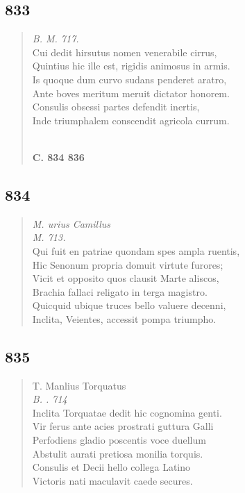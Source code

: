 \documentclass[11pt, a4paper]{report}
\begin{document}
            \subsection*{833}
      \begin{verse}
      \textit{B. M. 717.} \\ Cui dedit hirsutus nomen venerabile cirrus, \\ Quintius hic ille est, rigidis animosus in armis. \\ Is quoque dum curvo sudans penderet aratro, \\ Ante boves meritum meruit dictator honorem. \\ Consulis obsessi partes defendit inertis, \\ Inde triumphalem conscendit agricola currum. \\ 
        ﻿\pagebreak 
    \begin{center} \textbf{C. 834 836} \end{center} \marginpar{[302]} 
      \end{verse}
  
            \subsection*{834}
      \begin{verse}
      \textit{M. urius Camillus} \\ \textit{M. 713.} \\ Qui fuit en patriae quondam spes ampla ruentis, \\ Hic Senonum propria domuit virtute furores; \\ Vicit et opposito quos clausit Marte aliscos, \\ Brachia fallaci religato in terga magistro. \\ Quicquid ubique truces bello valuere decenni, \\ Inclita, Veientes, accessit pompa triumpho. \\ 
      \end{verse}
  
            \subsection*{835}
      \begin{verse}
      T. Manlius Torquatus \\ \textit{B. . 714} \\ Inclita Torquatae dedit hic cognomina genti. \\ Vir ferus ante acies prostrati guttura Galli \\ Perfodiens gladio poscentis voce duellum \\ Abstulit aurati pretiosa monilia torquis. \\ Consulis et Decii hello collega Latino \\ Victoris nati maculavit caede secures. \\ 
      \end{verse}
  
\end{document}
